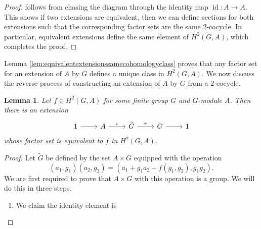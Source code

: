 \documentclass{dcthesis}
\newcommand{\mm}[1]{{\color{blue} \sf MM: [#1]}}
\newcommand{\wt}[1]{\widetilde{#1}}
\DeclareMathOperator{\id}{id}
\numberwithin{equation}{section}
\newtheorem{lemma}[equation]{Lemma}
\theoremstyle{definition}
\theoremstyle{remark}
\begin{document}
{{\begin{proof}
      follows from chasing the diagram through the
      identity map $\id\colon A\to A$.
      This shows if two extensions are equivalent,
      then we can define sections for both extensions
      such that the corresponding factor sets
      are the same $2$-cocycle.
      In particular,
      equivalent extensions define the same
      element of $H^2(G,A)$,
      which completes the proof.
    \end{proof}
    Lemma \ref{lem:equivalentextensionssamecohomologyclass}
    proves that any factor set for an
    extension of $A$ by $G$
    defines a unique class in
    $H^2(G,A)$.
    We now discuss the reverse process
    of constructing an extension of $A$ by $G$
    from a $2$-cocycle.
    \begin{lemma}
      \label{lem:constructextensionfromcocycle}
      Let $f\in H^2(G,A)$ for some finite group $G$
      and $G$-module $A$.
      Then there is an extension
      \begin{equation}
        \label{eqn:extensionfromcocycle}
        \begin{tikzcd}
          1\arrow{r}&A\arrow{r}{\iota}&\wt{G}\arrow{r}{\pi}
                    &G\arrow{r}&1
        \end{tikzcd}
      \end{equation}
      whose factor set is equivalent to $f$ in $H^2(G,A)$.
    \end{lemma}
    \begin{proof}
      Let $\wt{G}$ be defined by the set $A\times G$ equipped
      with the operation
      \begin{equation}
        \label{eqn:Efmultiplication}
        (a_1,g_1)(a_2,g_2)=
        (a_1+g_1a_2+f(g_1,g_2), g_1g_2).
      \end{equation}
      We are first required to prove that
      $A\times G$ with this operation is a group.
      We will do this in three steps.
      \begin{enumerate}
        \item
          \label{itm:identityelement}
          We claim the identity element is

\end{enumerate}
\end{proof}}}
\end{document}

